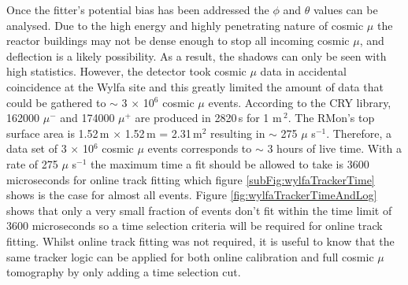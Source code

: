 Once the fitter's potential bias has been addressed the $\phi$ and $\theta$ values can be analysed. Due to the high energy and highly penetrating nature of cosmic $\mu$ \cite{Olive_2014} the reactor buildings may not be dense enough to stop all incoming cosmic $\mu$, and deflection is a likely possibility. As a result, the shadows can only be seen with high statistics. However, the detector took cosmic $\mu$ data in accidental coincidence at the Wylfa site and this greatly limited the amount of data that could be gathered to $\sim$ 3 $\times$ 10$^6$ cosmic $\mu$ events. According to the CRY library, \cite{ieee_cry_2007} 162000 $\mu^-$ and 174000 $\mu^+$ are produced in 2820\,s for 1 m\,$^2$. The RMon's top surface area is 1.52\,m $\times$ 1.52\,m = 2.31\,m$^2$ resulting in $\sim$ 275 $\mu$ s$^{-1}$. Therefore, a data set of 3 $\times$ 10$^6$ cosmic $\mu$ events corresponds to $\sim$ 3 hours of live time. With a rate of 275 $\mu$ s$^{-1}$ the maximum time a fit should be allowed to take is 3600 microseconds for online track fitting which figure \ref{subFig:wylfaTrackerTime} shows is the case for almost all events. Figure \ref{fig:wylfaTrackerTimeAndLog} shows that only a very small fraction of events don't fit within the time limit of 3600 microseconds so a time selection criteria will be required for online track fitting. Whilst online track fitting was not required, it is useful to know that the same tracker logic can be applied for both online calibration and full cosmic $\mu$ tomography by only adding a time selection cut. 

